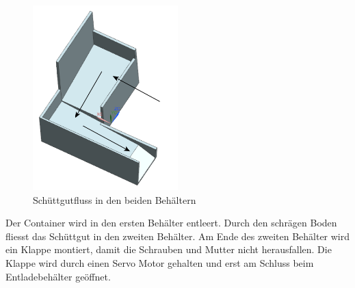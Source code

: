 \begin{figure}[H]
\centering
\includegraphics[width=0.5\textwidth]{03_Loesungskonzept/pictures/behaelter.png}
\caption{Schüttgutfluss in den beiden Behältern}
\end{figure}
Der Container wird in den ersten Behälter entleert. Durch den schrägen Boden fliesst das Schüttgut in den zweiten Behälter. Am Ende des zweiten Behälter wird ein Klappe montiert, damit die Schrauben und Mutter nicht herausfallen. Die Klappe wird durch einen Servo Motor gehalten und erst am Schluss beim Entladebehälter geöffnet.

